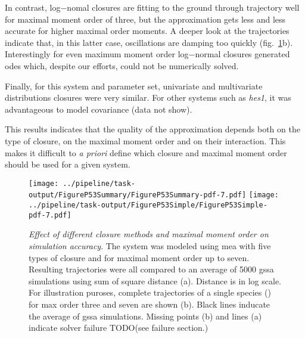 In contrast, log$-$nomal closures are fitting to the ground through trajectory well for maximal moment order of three,
but the approximation gets less and less accurate for higher maximal order moments.
A deeper look at the trajectories indicate that, in this latter case,
oscillations are damping too quickly (fig.~\ref{fig:max_order_and_closure_on_distance}b).
Interestingly for even maximum moment order log$-$normal closures generated \gls{ode}s which,
despite our efforts, could not be numerically solved.

Finally, for this system and parameter set, univariate and multivariate distributions closures were very similar.
For other systems such as \emph{hes1}, it was advantageous to model covariance (data not show).

This results indicates that the quality of the approximation depends both on the type of closure, on the maximal moment order and on their interaction. This makes it difficult to \emph{a priori} define which closure and maximal moment order should be used for a given system.

\begin{figure}

\texttt{[image: ../pipeline/task-output/FigureP53Summary/FigureP53Summary-pdf-7.pdf]}
\texttt{[image: ../pipeline/task-output/FigureP53Simple/FigureP53Simple-pdf-7.pdf]}
\caption{\emph{Effect of different closure methods and maximal moment order on simulation accuracy}.
The \pft system was modeled using \gls{mea} with five types of closure and for maximal moment order up to seven.
Resulting trajectories were all compared to an average of 5000 \gls{gssa} simulations using sum of square distance (a).
Distance is in log scale.
For illustration puroses, complete trajectories of a single species (\pft) for max order three and seven are shown (b).
Black lines inducate the average of \gls{gssa} simulations. Missing points (b) and lines (a) indicate solver failure
TODO(see failure section.)}

\label{fig:max_order_and_closure_on_distance}
\end{figure}
